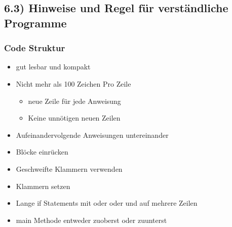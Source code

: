 \documentclass[11pt]{article}
\begin{document}
\subsection{6.3) Hinweise und Regel für verständliche Programme}
\label{sec:org87d5228}
\subsubsection{Code Struktur}
\label{sec:org5d4a82a}
\begin{itemize}
\item gut lesbar und kompakt\\
\item Nicht mehr als 100 Zeichen Pro Zeile\\
\begin{itemize}
\item neue Zeile für jede Anweisung\\
\item Keine unnötigen neuen Zeilen\\
\end{itemize}
\item Aufeinandervolgende Anweisungen untereinander\\
\item Blöcke einrücken\\
\item Geschweifte Klammern verwenden\\
\item Klammern setzen\\
\item Lange if Statements mit oder oder und auf mehrere Zeilen\\
\item main Methode entweder zuoberst oder zuunterst\\
\end{itemize}
\end{document}
